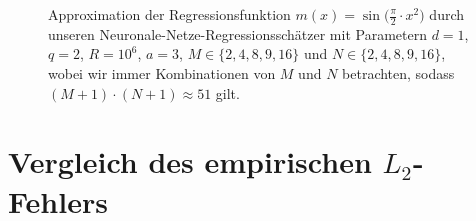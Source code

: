 \begin{figure}
    \begin{subfigure}[b]{0.5\textwidth}
        \centering
        \scalebox{0.9}{
          }
          \label{test2}
    \end{subfigure}
    \begin{subfigure}[b]{0.5\textwidth}
    \centering
    \scalebox{0.9}{
           }
           \label{fig:test}
    \end{subfigure}
       \hspace{0.1cm}
    \begin{subfigure}[b]{0.5\textwidth}
    \centering
    \scalebox{0.9}{
	}
	\label{teat1}
    \end{subfigure}
    \begin{subfigure}[b]{0.5\textwidth}
    \centering
     \scalebox{0.9}{
           }
           \label{test3}
    \end{subfigure}
    \begin{subfigure}[b]{1\textwidth}
        \centering
    \end{subfigure}
     \caption{Approximation der Regressionsfunktion $m(x) = \sin\big(\frac{\pi}{2} \cdot x^2\big)$ durch unseren Neuronale-Netze-Regressionsschätzer mit Parametern $d = 1$, $q = 2$, $R = 10^6$, $a = 3$, $M \in \{2,4,8,9,16\}$ und $N \in \{2,4,8,9,16\}$, wobei wir immer Kombinationen von $M$ und $N$ betrachten, sodass $(M + 1)\cdot(N + 1) \approx 51$ gilt.}
    \label{fig:subfig.a.5}
\end{figure}

\clearpage
\section{Vergleich des empirischen $L_2$-Fehlers}

